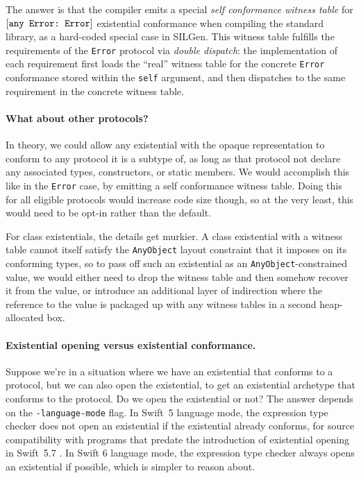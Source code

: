 \documentclass[../generics]{subfiles}
\begin{document}
The answer is that the compiler emits a special \emph{self conformance witness table} for $[\texttt{any Error:~Error}]$ existential conformance when compiling the standard library, as a hard-coded special case in SILGen. This witness table fulfills the requirements of the \texttt{Error} protocol via \emph{double dispatch}: the implementation of each requirement first loads the ``real'' witness table for the concrete \texttt{Error} conformance stored within the \texttt{self} argument, and then dispatches to the same requirement in the concrete witness table.

\paragraph{What about other protocols?} In theory, we could allow any existential with the \textsf{opaque} representation to conform to any protocol it is a subtype of, as long as that protocol not declare any associated types, constructors, or static members. We would accomplish this like in the \texttt{Error} case, by emitting a self conformance witness table. Doing this for all eligible protocols would increase code size though, so at the very least, this would need to be opt-in rather than the default.

For \textsf{class} existentials, the details get murkier. A class existential with a witness table cannot itself satisfy the \texttt{AnyObject} layout constraint that it imposes on its conforming types, so to pass off such an existential as an \texttt{AnyObject}-constrained value, we would either need to drop the witness table and then somehow recover it from the value, or introduce an additional layer of indirection where the reference to the value is packaged up with any witness tables in a second heap-allocated box.

\paragraph{Existential opening versus existential conformance.}
Suppose we're in a situation where we have an existential that conforms to a protocol, but we can also open the existential, to get an existential archetype that conforms to the protocol. Do we open the existential or not? The answer depends on the \texttt{-language-mode} flag. In Swift~5 language mode, the expression type checker does not open an existential if the existential already conforms, for source compatibility with programs that predate the introduction of existential opening in Swift~5.7 \cite{se0352}. In Swift 6 language mode, the expression type checker always opens an existential if possible, which is simpler to reason about.
\end{document}
